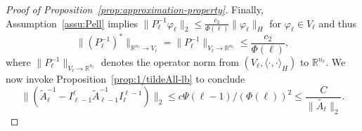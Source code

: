 \documentclass[10pt,a4paper]{amsart}
\begin{document}
\begin{proof}[Proof of Proposition~\ref{prop:approximation-property}]
	Finally, Assumption~\ref{assu:Pell} implies $\|P_{\ell}^{-1}\varphi_{\ell}\|_{2}\leq\frac{c_{2}}{\Phi(\ell)}\|\varphi_{\ell}\|_{H}$
	for $\varphi_{\ell}\in V_{\ell}$ and thus
	\[
		\|(P_{\ell}^{-1})^{*}\|_{\mathbb{R}^{n_{\ell}}\to V_{\ell}}=\|P_{\ell}^{-1}\|_{V_{\ell}\to\mathbb{R}^{n_{\ell}}}\leq\frac{c_{2}}{\Phi(\ell)},
	\]
	where $\|P_{\ell}^{-1}\|_{V_{\ell}\to\mathbb{R}^{n_{\ell}}}$ denotes
	the operator norm from $(V_{\ell},\langle\cdot,\cdot\rangle_{H})$
	to $\mathbb{R}^{n_{\ell}}$. We now invoke Proposition~\ref{prop:1/tildeAll-lb}
	to conclude
	\[
		\|(\widetilde{A}_{\ell}^{-1}-I_{\ell-1}^{\ell}\widetilde{A}_{\ell-1}^{-1}I_{\ell}^{\ell-1})\|_{2}\leq c\Psi(\ell-1)/(\Phi(\ell))^{2}\leq\frac{C}{\|\widetilde{A_{\ell}}\|_{2}}.
	\]
\end{proof}
\end{document}
